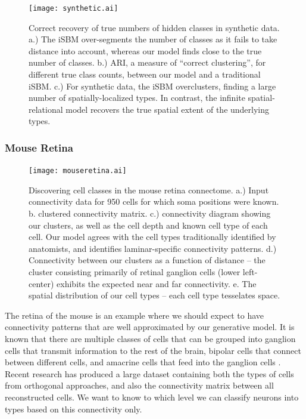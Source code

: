 \documentclass{article}
\begin{document}
\begin{figure}
  \centering 
  \centerline{\texttt{[image: synthetic.ai]}}
  \caption{Correct recovery of true numbers of hidden classes
in synthetic data. a.) The iSBM over-segments the number
of classes as it fails to take distance into account, whereas
our model finds close to the true number of classes. b.) ARI, a measure
of ``correct clustering'', for
different true class counts, between our model and a traditional
iSBM. c.) For synthetic data, 
the iSBM overclusters, finding a large number of spatially-localized types. 
In contrast, the infinite spatial-relational model recovers the true spatial
extent of the underlying types.}
\label{fig:synthetic}
\end{figure}

\subsubsection{Mouse Retina}

\begin{figure}
  \centering 
  \centerline{\texttt{[image: mouseretina.ai]}}
  \caption{Discovering cell classes in the mouse retina connectome. 
a.) Input connectivity data for 950 cells for which soma positions were known. b. clustered connectivity matrix. c.) connectivity diagram showing our clusters, as
well as the cell depth and known cell type of each cell. Our model agrees
with the cell types traditionally identified by anatomists, and identifies 
laminar-specific connectivity patterns. d.) Connectivity between our
clusters as a function of distance -- the cluster consisting primarily of
retinal ganglion cells (lower left-center) exhibits the expected near and
far connectivity. e. The spatial distribution of our cell types -- each cell type tesselates space.}
\label{fig:mouseretina}
\end{figure}

The retina of the mouse \autocite{Masland2001} is an example where we
should expect to have connectivity patterns that are well approximated
by our generative model. It is known that there are multiple classes
of cells that can be grouped into ganglion cells that transmit
information to the rest of the brain, bipolar cells that connect
between different cells, and amacrine cells that feed into the
ganglion cells \autocite{cite some review}. Recent research
\autocite{Helmstaedter2013} has produced a large dataset containing
both the types of cells from orthogonal approaches, and also the
connectivity matrix between all reconstructed cells. We want to know
to which level we can classify neurons into types based on this
connectivity only.
\end{document}
